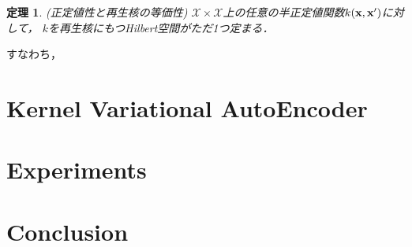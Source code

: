 \documentclass[11pt,a4j]{article}
\newtheorem{thm}{定理}
\begin{document}
      \begin{thm}
        (正定値性と再生核の等価性)
        $\mathcal{X} \times \mathcal{X}$上の任意の半正定値関数$k({\bf x},{\bf x}')$に対して，
        $k$を再生核にもつHilbert空間がただ1つ定まる．
      \end{thm}

      すなわち，

  \section{Kernel Variational AutoEncoder}
  \section{Experiments}
  \section{Conclusion}

\end{document}
